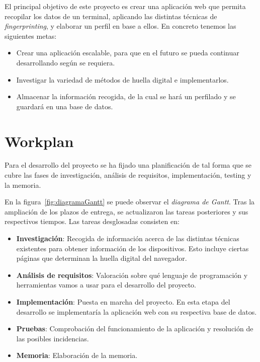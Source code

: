El principal objetivo de este proyecto es crear una aplicación web que permita recopilar los datos de un terminal, aplicando las distintas técnicas de \textit{fingerprinting}, y elaborar un perfil en base a ellos. En concreto tenemos las siguientes metas:
\begin{itemize}
    \item Crear una aplicación escalable, para que en el futuro se pueda continuar desarrollando según se requiera.
    \item Investigar la variedad de métodos de huella digital e implementarlos.
    \item Almacenar la información recogida, de la cual se hará un perfilado y se guardará en una base de datos.
\end{itemize}

\section{Workplan}
Para el desarrollo del proyecto se ha fijado una planificación de tal forma que se cubre las fases de investigación, análisis de requisitos, implementación, testing y la memoria.\par
En la figura~\ref{fig:diagramaGantt} se puede observar el \textit{diagrama de Gantt}. Tras la ampliación de los plazos de entrega, se actualizaron las tareas posteriores y sus respectivos tiempos. Las tareas desglosadas consisten en:
\begin{itemize}
    \item \textbf{Investigación}: Recogida de información acerca de las distintas técnicas existentes\cite{Huella} para obtener información de los dispositivos. Esto incluye ciertas páginas que determinan la huella digital del navegador\cite{amiunique}.
    \item \textbf{Análisis de requisitos}: Valoración sobre qué lenguaje de programación y herramientas vamos a usar para el desarrollo del proyecto.
    \item \textbf{Implementación}: Puesta en marcha del proyecto. En esta etapa del desarrollo se implementaría la aplicación web con su respectiva base de datos.
    \item \textbf{Pruebas}: Comprobación del funcionamiento de la aplicación y resolución de las posibles incidencias.
    \item \textbf{Memoria}: Elaboración de la memoria.
\end{itemize}